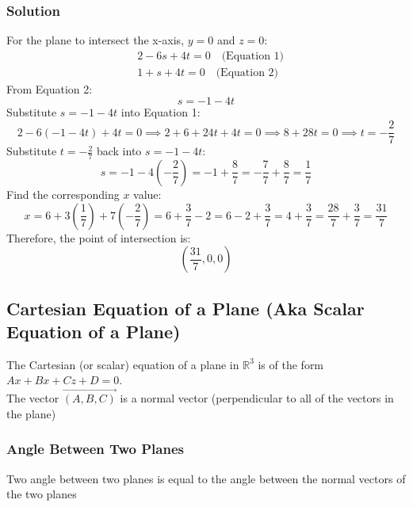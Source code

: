 \documentclass{article}
\begin{document}
\subsubsection*{Solution}
For the plane to intersect the x-axis, \(y = 0\) and \(z = 0\):
\begin{align*}
    &2 - 6s + 4t = 0 \quad \text{(Equation 1)} \\
    &1 + s + 4t = 0 \quad \text{(Equation 2)}
\end{align*}
From Equation 2:
\[
s = -1 - 4t
\]
Substitute \(s = -1 - 4t\) into Equation 1:
\[
2 - 6(-1 - 4t) + 4t = 0 \implies 2 + 6 + 24t + 4t = 0 \implies 8 + 28t = 0 \implies t = -\frac{2}{7}
\]
Substitute \(t = -\frac{2}{7}\) back into \(s = -1 - 4t\):
\[
s = -1 - 4\left(-\frac{2}{7}\right) = -1 + \frac{8}{7} = -\frac{7}{7} + \frac{8}{7} = \frac{1}{7}
\]
Find the corresponding \(x\) value:
\[
x = 6 + 3\left(\frac{1}{7}\right) + 7\left(-\frac{2}{7}\right) = 6 + \frac{3}{7} - 2 = 6 - 2 + \frac{3}{7} = 4 + \frac{3}{7} = \frac{28}{7} + \frac{3}{7} = \frac{31}{7}
\]
Therefore, the point of intersection is:
\[
\left( \frac{31}{7}, 0, 0 \right)
\]

\subsection{Cartesian Equation of a Plane (Aka Scalar Equation of a Plane)}

\begin{tcolorbox}[colback=red!5!snow, colframe=red!50!white,
  colbacktitle=red!75!mistyrose]
The Cartesian (or scalar) equation of a plane in $\mathbb{R}^3$ is of the form $Ax+Bx+Cz+D=0$. \\
The vector $\overrightarrow{(A,B,C)}$ is a normal vector (perpendicular to all of the vectors in the plane)
\end{tcolorbox}  
\subsubsection{Angle Between Two Planes}
\begin{tcolorbox}[colback=red!5!snow, colframe=red!50!white,
  colbacktitle=red!75!mistyrose]
Two angle between two planes is equal to the angle between the normal vectors of the two planes
  
\end{tcolorbox}  
\end{document}
